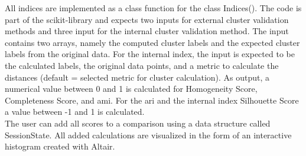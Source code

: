 All indices are implemented as a class function for the class Indices(). The code is part of the scikit-library \cite{scikitlearn} and expects two inputs for external cluster validation methods and three input for the internal cluster validation method. The input contains two arrays, namely the computed cluster labels and the expected cluster labels from the original data. For the internal index, the input is expected to be the calculated labels, the original data points, and a metric to calculate the distances (default = selected metric for cluster calculation). As output, a numerical value between 0 and 1 is calculated for Homogeneity Score, Completeness Score, and \acrfull{ami}. For the \acrfull{ari} and the internal index Silhouette Score a value between -1 and 1 is calculated.\\
The user can add all scores to a comparison using a data structure called SessionState. All added calculations are visualized in the form of an interactive histogram created with Altair.  
